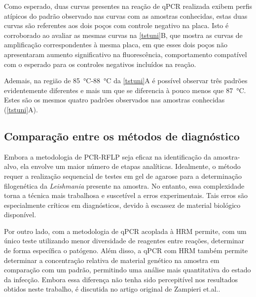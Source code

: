 Como esperado, duas curvas presentes na reação de qPCR realizada exibem perfis
atípicos do padrão observado nas curvas com as amostras conhecidas, estas duas
curvas são referentes aos dois poços com controle negativo na placa. Isto é
corroborado ao avaliar as mesmas curvas na \cref{tstuni}B, que mostra as curvas
de amplificação correspondentes à mesma placa, em que esses dois poços não
apresentaram aumento significativo na fluorescência, comportamento compatível
com o esperado para os controles negativos incluídos na reação.

Ademais, na região de \qty{85}{\celsius}-\qty{88}{\celsius} da \cref{tstuni}A é
possível observar três padrões evidentemente diferentes e mais um que se
diferencia à pouco menos que \qty{87}{\celsius}. Estes são os mesmos quatro
padrões observados nas amostras conhecidas (\cref{tstuni}A).

\subsection{Comparação entre os métodos de diagnóstico}
Embora a metodologia de PCR-RFLP seja eficaz na identificação da amostra-alvo, ela envolve um maior número de etapas analíticas. 
Idealmente, o método requer a realização sequencial de testes em gel de agarose para a determinação filogenética da \textit{Leishmania} 
presente na amostra. No entanto, essa complexidade torna a técnica mais trabalhosa e suscetível a erros experimentais. 
Tais erros são especialmente críticos em diagnósticos, devido à escassez de material biológico disponível.

Por outro lado, com a metodologia de qPCR acoplada à HRM permite, com um único
teste utilizando menor diversidade de reagentes entre reações, determinar de
forma específica o  patógeno. Além disso, a qPCR com HRM também permite
determinar a concentração relativa de material genético na amostra em comparação
com um padrão, permitindo uma análise mais quantitativa do estado da infecção. Embora essa diferença não tenha sido percepitível nos resultados obtidos neste
trabalho, é discutida no artigo original de Zampieri et.al.\cite{HRMzampi2016}.
